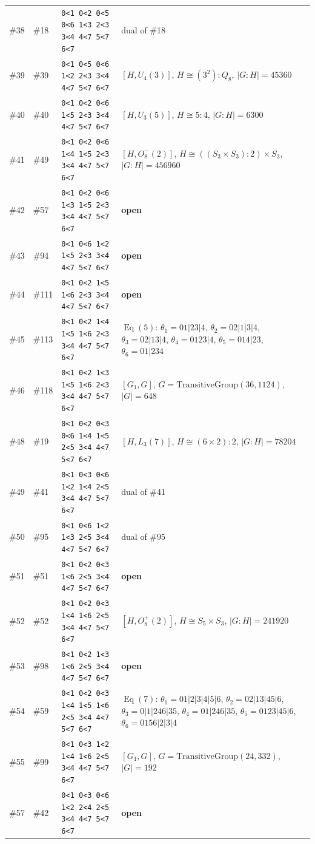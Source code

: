 \documentclass[11pt]{article}
\theoremstyle{remark}
\newcommand{\Eq}{\operatorname{Eq}}
\begin{document}
{\begin{longtable}{@{}l l p{4.9cm} p{7.4cm}@{}}
\#38 & \#18 & \texttt{0<1 0<2 0<5 0<6 1<3 2<3 3<4 4<7 5<7 6<7} & dual of \#18\\
\#39 & \#39 & \texttt{0<1 0<5 0<6 1<2 2<3 3<4 4<7 5<7 6<7} & $[H,U_4(3)]$, $H\cong (3^2){:}Q_8$, $|G:H|=45360$\\
\#40 & \#40 & \texttt{0<1 0<2 0<6 1<5 2<3 3<4 4<7 5<7 6<7} & $[H,U_3(5)]$, $H\cong 5{:}4$, $|G:H|=6300$\\
\#41 & \#49 & \texttt{0<1 0<2 0<6 1<4 1<5 2<3 3<4 4<7 5<7 6<7} & $[H,O_8^-(2)]$, $H\cong ((S_{3}\times S_{3}){:}2)\times S_{3}$, $|G:H|=456960$\\
\#42 & \#57 & \texttt{0<1 0<2 0<6 1<3 1<5 2<3 3<4 4<7 5<7 6<7} & \textbf{open}\\
\#43 & \#94 & \texttt{0<1 0<6 1<2 1<5 2<3 3<4 4<7 5<7 6<7} & \textbf{open}\\
\#44 & \#111 & \texttt{0<1 0<2 1<5 1<6 2<3 3<4 4<7 5<7 6<7} & \textbf{open}\\
\#45 & \#113 & \texttt{0<1 0<2 1<4 1<5 1<6 2<3 3<4 4<7 5<7 6<7} & $\Eq(5)$: $\theta_1=01|23|4$, $\theta_2=02|1|3|4$, $\theta_3=02|13|4$, $\theta_4=0123|4$, $\theta_5=014|23$, $\theta_6=01|234$\\
\#46 & \#118 & \texttt{0<1 0<2 1<3 1<5 1<6 2<3 3<4 4<7 5<7 6<7} & $[G_1,G]$, $G=\mathrm{TransitiveGroup}(36,1124)$, $|G|=648$\\
\#48 & \#19 & \texttt{0<1 0<2 0<3 0<6 1<4 1<5 2<5 3<4 4<7 5<7 6<7} & $[H,L_3(7)]$, $H\cong (6\times 2){:}2$, $|G:H|=78204$\\
\#49 & \#41 & \texttt{0<1 0<3 0<6 1<2 1<4 2<5 3<4 4<7 5<7 6<7} & dual of \#41\\
\#50 & \#95 & \texttt{0<1 0<6 1<2 1<3 2<5 3<4 4<7 5<7 6<7} & dual of \#95\\
\#51 & \#51 & \texttt{0<1 0<2 0<3 1<6 2<5 3<4 4<7 5<7 6<7} & \textbf{open}\\
\#52 & \#52 & \texttt{0<1 0<2 0<3 1<4 1<6 2<5 3<4 4<7 5<7 6<7} & $[H,O_8^+(2)]$, $H\cong S_{5}\times S_{3}$, $|G:H|=241920$\\
\#53 & \#98 & \texttt{0<1 0<2 1<3 1<6 2<5 3<4 4<7 5<7 6<7} & \textbf{open}\\
\#54 & \#59 & \texttt{0<1 0<2 0<3 1<4 1<5 1<6 2<5 3<4 4<7 5<7 6<7} & $\Eq(7)$: $\theta_1=01|2|3|4|5|6$, $\theta_2=02|13|45|6$, $\theta_3=0|1|246|35$, $\theta_4=01|246|35$, $\theta_5=0123|45|6$, $\theta_6=0156|2|3|4$\\
\#55 & \#99 & \texttt{0<1 0<3 1<2 1<4 1<6 2<5 3<4 4<7 5<7 6<7} & $[G_1,G]$, $G=\mathrm{TransitiveGroup}(24,332)$, $|G|=192$\\
\#57 & \#42 & \texttt{0<1 0<3 0<6 1<2 2<4 2<5 3<4 4<7 5<7 6<7} & \textbf{open}\\

\end{longtable}}
\end{document}

